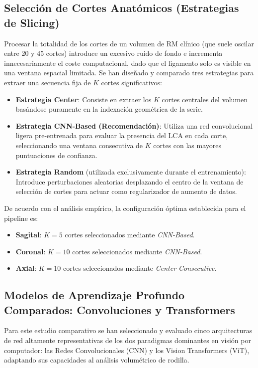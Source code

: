 \subsection{Selección de Cortes Anatómicos (Estrategias de Slicing)}
Procesar la totalidad de los cortes de un volumen de RM clínico (que suele oscilar entre 20 y 45 cortes) introduce un excesivo ruido de fondo e incrementa innecesariamente el coste computacional, dado que el ligamento solo es visible en una ventana espacial limitada. Se han diseñado y comparado tres estrategias para extraer una secuencia fija de $K$ cortes significativos:
\begin{itemize}
    \item \textbf{Estrategia Center}: Consiste en extraer los $K$ cortes centrales del volumen basándose puramente en la indexación geométrica de la serie.
    \item \textbf{Estrategia CNN-Based (Recomendación)}: Utiliza una red convolucional ligera pre-entrenada para evaluar la presencia del LCA en cada corte, seleccionando una ventana consecutiva de $K$ cortes con las mayores puntuaciones de confianza.
    \item \textbf{Estrategia Random} (utilizada exclusivamente durante el entrenamiento): Introduce perturbaciones aleatorias desplazando el centro de la ventana de selección de cortes para actuar como regularizador de aumento de datos.
\end{itemize}

De acuerdo con el análisis empírico, la configuración óptima establecida para el pipeline es:
\begin{itemize}
    \item \textbf{Sagital}: $K=5$ cortes seleccionados mediante \textit{CNN-Based}.
    \item \textbf{Coronal}: $K=10$ cortes seleccionados mediante \textit{CNN-Based}.
    \item \textbf{Axial}: $K=10$ cortes seleccionados mediante \textit{Center Consecutive}.
\end{itemize}
\subsection{Modelos de Aprendizaje Profundo Comparados: Convoluciones y Transformers}
Para este estudio comparativo se han seleccionado y evaluado cinco arquitecturas de red altamente representativas de los dos paradigmas dominantes en visión por computador: las Redes Convolucionales (CNN) y los Vision Transformers (ViT), adaptando sus capacidades al análisis volumétrico de rodilla.

